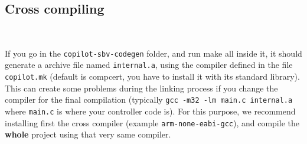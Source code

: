 \subsection{Cross compiling}~\label{sec:cross} 

If you go in the \texttt{copilot-sbv-codegen} folder, and run make all inside it, it should generate a archive file named \texttt{internal.a}, using the compiler defined in the file \texttt{copilot.mk} (default is compcert, you have to install it with its standard library). This can create some problems during the linking process if you change the compiler for the final compilation (typically \texttt{gcc -m32 -lm main.c internal.a} where \texttt{main.c} is where your controller code is). For this purpose, we recommend installing first the cross compiler (example \texttt{arm-none-eabi-gcc}), and compile the \textbf{whole} project using that very same compiler. 
